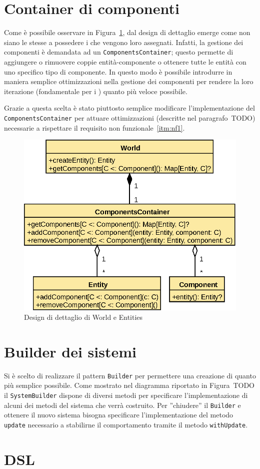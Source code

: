 

\section{Container di componenti}\label{sec:container-di-componenti}
Come è possibile osservare in Figura~\ref{fig:world-detail}, dal design di dettaglio emerge come
non siano le \Entity stesse a possedere i \Component che vengono loro assegnati.
Infatti, la gestione dei componenti è demandata ad un \texttt{ComponentsContainer}; questo permette
di aggiungere o rimuovere coppie entità-componente o ottenere tutte le entità con uno specifico tipo
di componente.
In questo modo è possibile introdurre in maniera semplice ottimizzazioni nella gestione dei
componenti per rendere la loro iterazione (fondamentale per i \System) quanto più veloce possibile.

Grazie a questa scelta è stato piuttosto semplice modificare l'implementazione del
\texttt{ComponentsContainer} per attuare ottimizzazioni (descritte nel paragrafo~TODO)
necessarie a rispettare il requisito non funzionale~\ref{itm:nf1}.
\begin{figure}
    \includegraphics{./img/WorldDetail}
    \caption{Design di dettaglio di World e Entities}
    \label{fig:world-detail}
\end{figure}

\section{Builder dei sistemi}\label{sec:builder-dei-sistemi}
Si è scelto di realizzare il pattern \texttt{Builder} per permettere una creazione di \System
quanto più semplice possibile.
Come mostrato nel diagramma riportato in Figura~TODO il \texttt{SystemBuilder} dispone di diversi metodi per
specificare l'implementazione di alcuni dei metodi del sistema che verrà costruito.
Per ''chiudere'' il \texttt{Builder} e ottenere il nuovo sistema bisogna specificare
l'implementazione del metodo \texttt{update} necessario a stabilirne il comportamento tramite il metodo
\texttt{withUpdate}.

\section{DSL}\label{sec:dsl}
